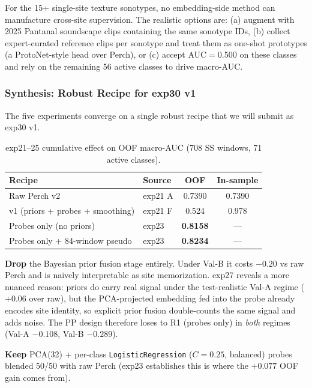 For the 15+ single-site texture sonotypes, no embedding-side method
can manufacture cross-site supervision. The realistic options are:
(a) augment with 2025 Pantanal soundscape clips containing the same
sonotype IDs, (b) collect expert-curated reference clips per sonotype
and treat them as one-shot prototypes (a ProtoNet-style head over
Perch), or (c) accept AUC$=$0.500 on these classes and rely on the
remaining 56 active classes to drive macro-AUC.

\subsubsection{Synthesis: Robust Recipe for exp30 v1}
\label{sec:exp21-25-synthesis}

The five experiments converge on a single robust recipe that we will
submit as exp30 v1.

\begin{table}[h]
\centering
\caption{exp21--25 cumulative effect on OOF macro-AUC (708 SS windows, 71 active classes).}
\label{tab:exp21-25-summary}
\begin{tabular}{llcc}
\hline
\textbf{Recipe} & \textbf{Source} & \textbf{OOF} & \textbf{In-sample} \\
\hline
Raw Perch v2                         & exp21 A & 0.7390 & 0.7390 \\
v1 (priors + probes + smoothing)     & exp21 F & 0.524  & 0.978 \\
Probes only (no priors)              & exp23   & \textbf{0.8158} & --- \\
Probes only + 84-window pseudo       & exp23   & \textbf{0.8234} & --- \\
\hline
\end{tabular}
\end{table}

\textbf{Drop} the Bayesian prior fusion stage entirely. Under Val-B
it costs $-0.20$ vs raw Perch and is naively interpretable as site
memorization. exp27 reveals a more nuanced reason: priors do carry
real signal under the test-realistic Val-A regime ($+0.06$ over raw),
but the PCA-projected embedding fed into the probe already encodes
site identity, so explicit prior fusion double-counts the same signal
and adds noise. The PP design therefore loses to R1 (probes only) in
\emph{both} regimes (Val-A $-0.108$, Val-B $-0.289$).

\textbf{Keep} PCA(32) + per-class \texttt{LogisticRegression}
($C{=}0.25$, balanced) probes blended 50/50 with raw Perch
(exp23 establishes this is where the $+0.077$ OOF gain comes from).

